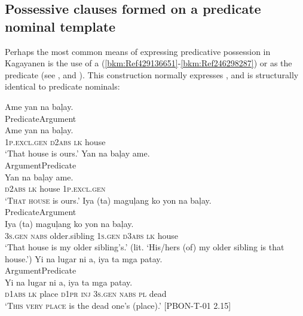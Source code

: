 \subsection{Possessive clauses formed on a predicate nominal template}
\label{sec:predicativepossession-predicatenominal}

Perhaps the most common means of expressing predicative possession in Kagayanen is the use of a   (\ref{bkm:Ref429136651}-\ref{bkm:Ref246298287}) or   as the predicate (see ,  and ). This construction normally expresses , and is structurally identical to predicate nominals:
 
\ea
\label{bkm:Ref429136651}
Ame  yan  na  baļay. \\\smallskip
Predicate\hspace{.5cm}Argument \\
\gll Ame  yan  na  baļay. \\
1\textsc{p.excl.gen}  \textsc{d2abs}  \textsc{lk}   house \\
\glt ‘That house is ours.’
\z
\ea
\label{bkm:Ref246298287}
Yan  na  baļay  ame. \\\smallskip
Argument\hspace{1cm}Predicate \\
\gll Yan  na  baļay  ame. \\
\textsc{d2abs}  \textsc{lk}  house  1\textsc{p.excl}.\textsc{gen} \\
\glt ‘\textsc{That house} is ours.’
\z
\ea
\label{bkm:Ref429136604}
Iya  (ta)  maguļang  ko  yon  na  baļay. \\\smallskip
Predicate\hspace{3.5cm}Argument \\
\gll Iya  (ta)  maguļang  ko  yon  na  baļay. \\
3\textsc{s.gen}  \textsc{nabs}  older.sibling  1\textsc{s.gen}  \textsc{d3abs}  \textsc{lk}  house \\
\glt ‘That house is my older sibling’s.’ (lit. ‘His/hers (of) my older sibling is that house.’)
\z
\ea
Yi  na  lugar  ni  a,  iya  ta  mga  patay. \\\smallskip
Argument\hspace{2.9cm}Predicate \\
\gll Yi  na  lugar  ni  a,  iya  ta  mga  patay. \\
\textsc{d1abs}  \textsc{lk}  place  \textsc{d1pr}  \textsc{inj}  3\textsc{s.gen}  \textsc{nabs}  \textsc{pl}  dead \\
\glt ‘\textsc{This very place} is the dead one’s (place).’ [PBON-T-01 2.15]
\z

